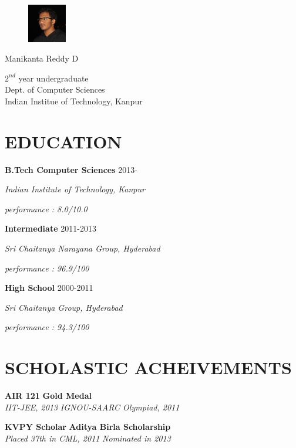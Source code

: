 \documentclass{article}
\newcommand{\sepspace}{\vspace*{1em}}
\newcommand{\MyName}[1]{
		\huge \usefont{OT1}{phv}{b}{n} \hfill #1 		
		\par \normalsize \normalfont}
\newcommand{\NewPart}[1]{\section*{\uppercase{#1}}}
\newcommand{\EducationEntry}[4]{
		\noindent \textbf{#1} \hfill 	{#2} \par				
		\noindent \textit{#3} \par	
		\noindent #4 	
		\normalsize \par}
\newcommand{\ScholasticAcheivements}[4]{
		\noindent \textbf{#1} \hfill \textbf{#2} \\
		\textit{#3}	 \hfill	 \textit{ #4} 	
		\normalsize \par}
\begin{document}
\begin{figure}
	\vspace*{-2em}
		\includegraphics[width=0.15\textwidth]{photo.jpg}
\end{figure}

\MyName{Manikanta Reddy D}
\begin{flushright}
$2^{nd}$ year undergraduate\\
Dept. of Computer Sciences\\
Indian Institue of Technology, Kanpur
\end{flushright}
\sepspace
\NewPart{Education}{}
\EducationEntry{B.Tech Computer Sciences}{2013-}{Indian Institute of Technology, Kanpur}{\emph{performance : 8.0/10.0}}
\sepspace
\EducationEntry{Intermediate}{2011-2013}{Sri Chaitanya Narayana Group, Hyderabad}{\b{\emph{performance : 96.9/100}}}
\sepspace
\EducationEntry{High School}{2000-2011}{Sri Chaitanya Group, Hyderabad}{\b{\emph{performance : 94.3/100}}}
\sepspace

\NewPart{Scholastic Acheivements}{}
\ScholasticAcheivements{AIR 121}{Gold Medal}{IIT-JEE, 2013}{IGNOU-SAARC Olympiad, 2011}
\sepspace
\ScholasticAcheivements{KVPY Scholar}{Aditya Birla Scholarship}{Placed 37th in CML, 2011}{Nominated in 2013}
\sepspace
\end{document}

